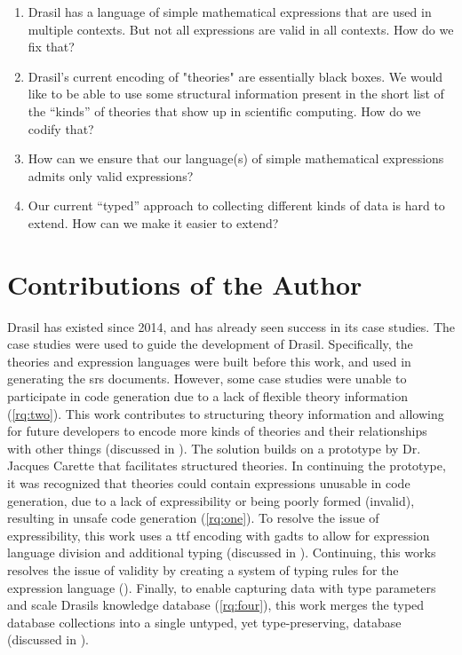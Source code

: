 \begin{enumerate}

      \item[\namedlabel{rq:one}{RQ1}] Drasil has a language of simple
            mathematical expressions that are used in multiple contexts. But not
            all expressions are valid in all contexts. How do we fix that?

      \item[\namedlabel{rq:two}{RQ2}] Drasil's current encoding of "theories"
            are essentially black boxes. We would like to be able to use some
            structural information present in the short list of the ``kinds'' of
            theories that show up in scientific computing. How do we codify
            that?

      \item[\namedlabel{rq:three}{RQ3}] How can we ensure that our language(s)
            of simple mathematical expressions admits only valid expressions?

      \item[\namedlabel{rq:four}{RQ4}] Our current ``typed'' approach to
            collecting different kinds of data is hard to extend. How can we
            make it easier to extend?

\end{enumerate}

\section{Contributions of the Author}
\label{sec:intro:contributions}

Drasil has existed since 2014, and has already seen success in its case studies.
The case studies were used to guide the development of Drasil. Specifically, the
theories and expression languages were built before this work, and used in
generating the \acs{srs} documents. However, some case studies were unable to
participate in code generation due to a lack of flexible theory information
(\ref{rq:two}). This work contributes to structuring theory information and
allowing for future developers to encode more kinds of theories and their
relationships with other things (discussed in ). The
solution builds on a prototype by Dr. Jacques Carette that facilitates structured theories. In continuing the
prototype, it was recognized that theories could contain expressions unusable in
code generation, due to a lack of expressibility or being poorly formed
(invalid), resulting in unsafe code generation (\ref{rq:one}). To resolve the
issue of expressibility, this work uses a \acs{ttf} \cite{Carette2009} encoding
with \acsp{gadt} to allow for expression language division and additional typing
(discussed in ). Continuing, this works resolves the issue
of validity by creating a system of typing rules for the expression language
(). Finally, to enable capturing data with type parameters
and scale Drasils knowledge database (\ref{rq:four}), this work merges the typed
database collections into a single untyped, yet type-preserving, database
(discussed in ).

